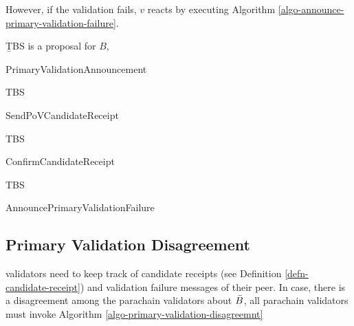 However, if the validation fails, $v$ reacts by executing Algorithm \ref{algo-announce-primary-validation-failure}.

\begin{definition}
  \label{defn-candidate-receipt}
        {\b TBS} is a proposal for $B$,
\end{definition}

\begin{algorithm}
  \caption[PrimaryValidationAnnouncement]{\sc PrimaryValidationAnnouncement}
  \label{algo-primary-validation-announcement}
  \begin{algorithmic}[1]
    \Require{}
    
    \State TBS
  \end{algorithmic}
\end{algorithm}


\begin{algorithm}
  \caption[]{\sc SendPoVCandidateReceipt}
  \label{algo-send-candidate-receipt}
  \begin{algorithmic}[1]
    \Require{}
    
    \State TBS
  \end{algorithmic}
\end{algorithm}

\begin{algorithm}
  \caption[]{\sc ConfirmCandidateReceipt}
  \label{algo-endorse-candidate-receipt}
  \begin{algorithmic}[1]
    \Require{}
    
    \State TBS
  \end{algorithmic}
\end{algorithm}

\begin{algorithm}
  \caption[]{\sc AnnouncePrimaryValidationFailure}
  \label{algo-announce-primary-validation-failure}
  \begin{algorithmic}[1]
    \Require{}
    
    \State
  \end{algorithmic}
\end{algorithm}

\subsection{Primary Validation Disagreement}
 validators need to keep track of candidate receipts (see Definition \ref{defn-candidate-receipt}) and validation failure messages of their peer. In case, there is a disagreement among the parachain validators about $\bar{B}$, all parachain validators must invoke Algorithm \ref{algo-primary-validation-disagreemnt}

